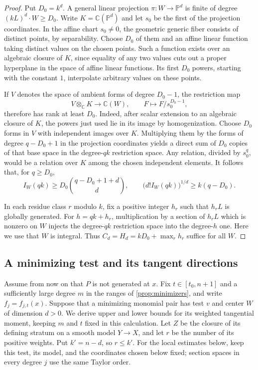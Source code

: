 \begin{proof}
Put $D_0=k^d$. A general linear projection $\pi:W\to\mathbb P^d$ is finite of degree $(kL)^d\cdot W\ge D_0$. Write $K=\mathbb C(\mathbb P^d)$ and let $s_0$ be the first of the projection coordinates. In the affine chart $s_0\ne0$, the geometric generic fiber consists of distinct points, by separability. Choose $D_0$ of them and an affine linear function taking distinct values on the chosen points. Such a function exists over an algebraic closure of $K$, since equality of any two values cuts out a proper hyperplane in the space of affine linear functions. Its first $D_0$ powers, starting with the constant $1$, interpolate arbitrary values on these points.

If $V$ denotes the space of ambient forms of degree $D_0-1$, the restriction map
\[
 V\otimes_{\mathbb C}K\longrightarrow\mathbb C(W),
 \qquad F\longmapsto F/s_0^{D_0-1},
\]
therefore has rank at least $D_0$. Indeed, after scalar extension to an algebraic closure of $K$, the powers just used lie in its image by homogenization. Choose $D_0$ forms in $V$ with independent images over $K$. Multiplying them by the forms of degree $q-D_0+1$ in the projection coordinates yields a direct sum of $D_0$ copies of that base space in the degree-$qk$ restriction space. Any relation, divided by $s_0^q$, would be a relation over $K$ among the chosen independent elements. It follows that, for $q\ge D_0$,
\[
 I_W(qk)\ge D_0\binom{q-D_0+1+d}{d},
 \qquad
 \bigl(d!I_W(qk)\bigr)^{1/d}\ge k(q-D_0).
\]

In each residue class $r$ modulo $k$, fix a positive integer $h_r$ such that $h_rL$ is globally generated. For $h=qk+h_r$, multiplication by a section of $h_rL$ which is nonzero on $W$ injects the degree-$qk$ restriction space into the degree-$h$ one. Here we use that $W$ is integral. Thus $C_d=H_d=kD_0+\max_r h_r$ suffice for all $W$.
\end{proof}

\subsection{A minimizing test and its tangent directions}

Assume from now on that $P$ is not generated at $x$. Fix $t\in[t_0,n+1]$ and a sufficiently large degree $m$ in the ranges of \cref{prop:minimizers}, and write $f_j=f_{j,t}(x)$. Suppose that a minimizing monomial pair has test $v$ and center $W$ of dimension $d>0$. We derive upper and lower bounds for its weighted tangential moment, keeping $m$ and $t$ fixed in this calculation. Let $Z$ be the closure of its defining stratum on a smooth model $Y\to X$, and let $r$ be the number of its positive weights. Put $k'=n-d$, so $r\le k'$. For the local estimates below, keep this test, its model, and the coordinates chosen below fixed; section spaces in every degree $j$ use the same Taylor order.

